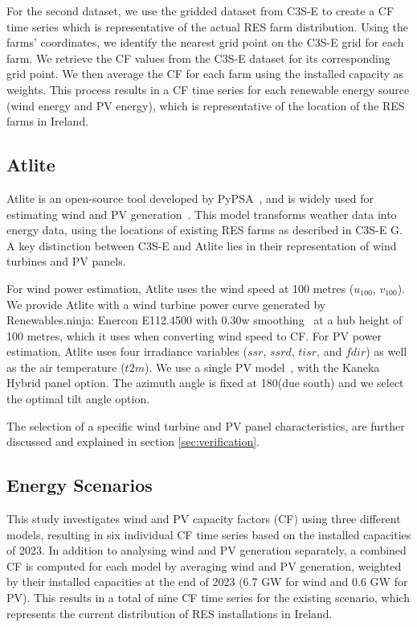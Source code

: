 \documentclass[a4paper, 11pt]{article}
\begin{document}
For the second dataset, we use the gridded dataset from C3S-E to create a CF time series which is representative of the actual RES farm distribution. Using the farms' coordinates, we identify the nearest grid point on the C3S-E grid for each farm. We retrieve the CF values from the C3S-E dataset for its corresponding grid point. We then average the CF for each farm using the installed capacity as weights. This process results in a CF time series for each renewable energy source (wind energy and PV energy), which is representative of the location of the RES farms in Ireland. 

\subsection{Atlite} 
\label{sec:atlite}

Atlite is an open-source tool developed by PyPSA~\cite{hofman2021atlite}, and is widely used for estimating wind and PV generation~\cite{mockert2023drought, li2023atlite, parzen2023atlite, ali2023comparative}. This model transforms weather data into energy data, using the locations of existing RES farms as described in C3S-E G. A key distinction between C3S-E and Atlite lies in their representation of wind turbines and PV panels.

For wind power estimation, Atlite uses the wind speed at 100 metres ($u_{100}$, $v_{100}$). We provide Atlite with a wind turbine power curve generated by Renewables.ninja: Enercon E112.4500 with 0.30w smoothing~\cite{staffell2016wake} at a hub height of 100 metres, which it uses when converting wind speed to CF. For PV power estimation, Atlite uses four irradiance variables ($ssr$, $ssrd$, $tisr$, and $fdir$) as well as the air temperature ($t2m$). We use a single PV model~\cite{beyer2004pv}, with the Kaneka Hybrid panel option. The azimuth angle is fixed at 180\textdegree (due south) and we select the optimal tilt angle option.

The selection of a specific wind turbine and PV panel characteristics, are further discussed and explained in section \ref{sec:verification}.

\subsection{Energy Scenarios}
\label{sec:scenarios}

This study investigates wind and PV capacity factors (CF) using three different models, resulting in six individual CF time series based on the installed capacities of 2023. In addition to analysing wind and PV generation separately, a combined CF is computed for each model by averaging wind and PV generation, weighted by their installed capacities at the end of 2023 (6.7 GW for wind and 0.6 GW for PV). This results in a total of nine CF time series for the existing scenario, which represents the current distribution of RES installations in Ireland.
\end{document}
